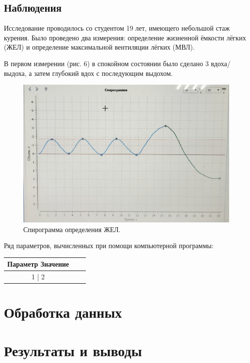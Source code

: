 \documentclass{article}
\begin{document}
        \subsection*{Наблюдения}
            
            \hspace*{4mm} Исследование проводилось со студентом 19 лет, имеющего небольшой стаж курения.
            Было проведено два измерения: определение жизненной ёмкости лёгких (ЖЕЛ) и 
            определение максимальной вентиляции лёгких (МВЛ).
            \vspace*{4mm}

            В первом измерении (рис. 6) в спокойном состоянии было сделано 3 вдоха/выдоха, а затем
            глубокий вдох с последующим выдохом.
            \vspace*{4mm}

            \begin{figure}[h]
                \centering
                \includegraphics*[width=\textwidth]{ЖЕЛ.jpg}
                \caption{Спирограмма определения ЖЕЛ.}
            \end{figure}

            Ряд параметров, вычисленных при помощи компьютерной программы:

            \begin{center}
                \begin{tabular}{|c| | c | c}
                    \hline
                    Параметр  Значение \\
                    \hline
                    1 | 2 
                    
                \end{tabular}
            \end{center}

        


    \newpage


    \section*{Обработка данных}


    \newpage

    \section*{Результаты и выводы}


    \newpage
\end{document}
